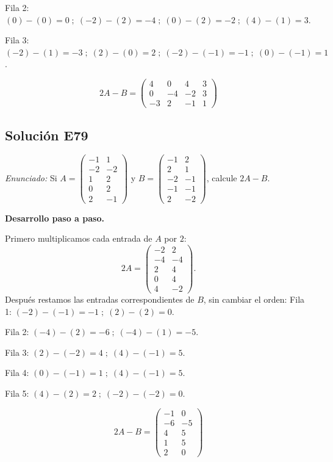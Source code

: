 \documentclass[12pt]{article}
\theoremstyle{remark}
\newcommand{\solucion}[2]{\Needspace{11\baselineskip}\subsection*{Solución E#1}\noindent\textit{Enunciado:} #2\par\medskip\noindent\textbf{Desarrollo paso a paso.}\par\medskip}
\begin{document}
Fila 2: $(0)-(0)=0\; ;\; (-2)-(2)=-4\; ;\; (0)-(2)=-2\; ;\; (4)-(1)=3$.

Fila 3: $(-2)-(1)=-3\; ;\; (2)-(0)=2\; ;\; (-2)-(-1)=-1\; ;\; (0)-(-1)=1$.

\[
\boxed{2A-B=\begin{pmatrix}4&0&4&3\\0&-4&-2&3\\-3&2&-1&1\end{pmatrix}}
\]

\medskip

\solucion{79}{Si $A=\begin{pmatrix}-1&1\\-2&-2\\1&2\\0&2\\2&-1\end{pmatrix}$ y $B=\begin{pmatrix}-1&2\\2&1\\-2&-1\\-1&-1\\2&-2\end{pmatrix}$, calcule $2A-B$.}
Primero multiplicamos cada entrada de $A$ por $2$:
\[
2A=\begin{pmatrix}-2&2\\-4&-4\\2&4\\0&4\\4&-2\end{pmatrix}.
\]
Después restamos las entradas correspondientes de $B$, sin cambiar el orden:
Fila 1: $(-2)-(-1)=-1\; ;\; (2)-(2)=0$.

Fila 2: $(-4)-(2)=-6\; ;\; (-4)-(1)=-5$.

Fila 3: $(2)-(-2)=4\; ;\; (4)-(-1)=5$.

Fila 4: $(0)-(-1)=1\; ;\; (4)-(-1)=5$.

Fila 5: $(4)-(2)=2\; ;\; (-2)-(-2)=0$.

\[
\boxed{2A-B=\begin{pmatrix}-1&0\\-6&-5\\4&5\\1&5\\2&0\end{pmatrix}}
\]

\medskip
\end{document}
